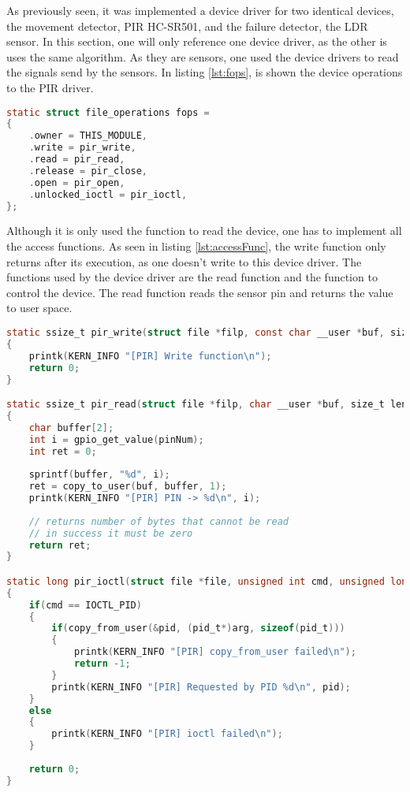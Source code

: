 %
As previously seen, it was implemented a device driver for two identical devices, the movement detector, PIR HC-SR501, and the failure detector, the LDR sensor. In this section, one will only reference one device driver, as the other is uses the same algorithm. As they are sensors, one used the device drivers to read the signals send by the sensors. In listing \ref{lst:fops}, is shown the device operations to the PIR driver.

\begin{lstlisting}[language=C, caption={Device Driver Operations.}, label={lst:fops}]
static struct file_operations fops = 
{
	.owner = THIS_MODULE,
	.write = pir_write,
	.read = pir_read,
	.release = pir_close,
	.open = pir_open,
	.unlocked_ioctl = pir_ioctl,
};
\end{lstlisting}

Although it is only used the function to read the device, one has to implement all the access functions. As seen in listing \ref{lst:accessFunc}, the write function only returns after its execution, as one doesn't write to this device driver. The functions used by the device driver are the read function and the function to control the device. The read function reads the sensor pin and returns the value to user space.

\begin{lstlisting}[language=C, caption={Device Driver access functions implementation.}, label={lst:accessFunc}]
static ssize_t pir_write(struct file *filp, const char __user *buf, size_t len, loff_t *off) 
{	
	printk(KERN_INFO "[PIR] Write function\n");
	return 0;
}

static ssize_t pir_read(struct file *filp, char __user *buf, size_t len, loff_t *off)
{
	char buffer[2];
	int i = gpio_get_value(pinNum);
	int ret = 0;
	
	sprintf(buffer, "%d", i);
	ret = copy_to_user(buf, buffer, 1);
	printk(KERN_INFO "[PIR] PIN -> %d\n", i);
	
	// returns number of bytes that cannot be read
	// in success it must be zero
	return ret;
}

static long pir_ioctl(struct file *file, unsigned int cmd, unsigned long arg)
{	
	if(cmd == IOCTL_PID)
	{
		if(copy_from_user(&pid, (pid_t*)arg, sizeof(pid_t))) 
		{
			printk(KERN_INFO "[PIR] copy_from_user failed\n"); 
			return -1;
		}
		printk(KERN_INFO "[PIR] Requested by PID %d\n", pid);
	}
	else
	{
		printk(KERN_INFO "[PIR] ioctl failed\n");	
	}
	
	return 0;
}
\end{lstlisting}

